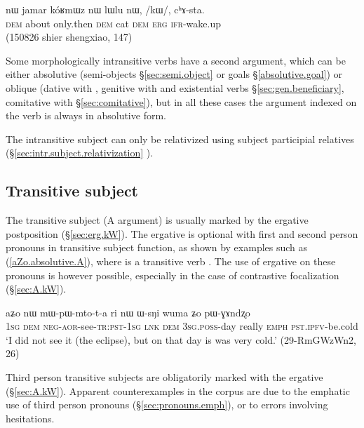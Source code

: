 \begin{exe}
\ex \label{ex:kW.chAsta}
 \gll nɯ jamar kóʁmɯz nɯ lɯlu nɯ, /kɯ/, cʰɤ-sta. \\
 \textsc{dem} about only.then \textsc{dem} cat \textsc{dem} \textsc{erg} \textsc{ifr}-wake.up \\
 \glt (150826 shier shengxiao, 147)
\end{exe}

Some morphologically intransitive verbs have a second argument, which can be either absolutive (semi-objects §\ref{sec:semi.object} or goals §\ref{absolutive.goal}) or oblique (dative with , genitive with  and existential verbs §\ref{sec:gen.beneficiary},  comitative with  §\ref{sec:comitative}), but in all these cases the argument indexed on the verb is always in absolutive form. 

The intransitive subject can only be relativized using subject participial relatives (§\ref{sec:intr.subject.relativization} ).

\subsection{Transitive subject} \label{sec:absolutive.A}
The transitive subject (A argument) is usually marked by the ergative postposition  (§\ref{sec:erg.kW}). The ergative is optional with first and second person pronouns in transitive subject function, as shown by examples such as (\ref{aZo.absolutive.A}), where  is a transitive verb . The use of ergative on these pronouns is however possible, especially in the case of contrastive focalization (§\ref{sec:A.kW}).

\begin{exe}
\ex \label{aZo.absolutive.A}
 \gll aʑo nɯ mɯ-pɯ-mto-t-a ri nɯ ɯ-sŋi wuma ʑo pɯ-ɣɤndʐo \\
\textsc{1sg} \textsc{dem} \textsc{neg}-\textsc{aor}-see-\textsc{tr}:\textsc{pst}-\textsc{1sg} \textsc{lnk} \textsc{dem} \textsc{3sg}.\textsc{poss}-day really \textsc{emph} \textsc{pst}.\textsc{ipfv}-be.cold  \\
 \glt `I did not see it (the eclipse), but on that day is was very cold.' (29-RmGWzWn2, 26)
\end{exe}

Third person transitive subjects are obligatorily marked with the ergative (§\ref{sec:A.kW}). Apparent counterexamples in the corpus are due to the emphatic use of third person pronouns (§\ref{sec:pronouns.emph}), or to errors involving hesitations.

